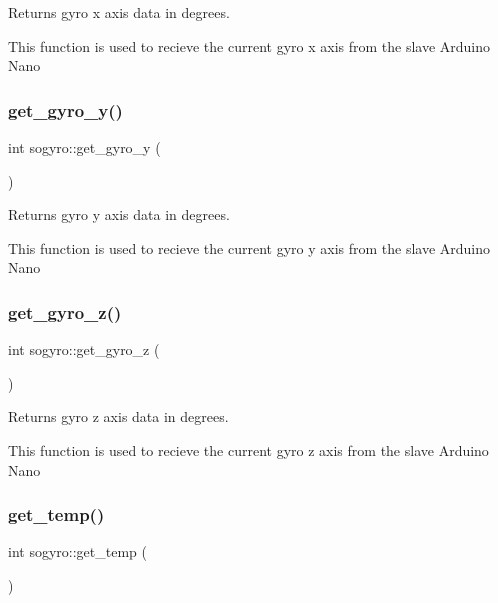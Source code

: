 Returns gyro x axis data in degrees. 

This function is used to recieve the current gyro x axis from the slave Arduino Nano \mbox{\label{classsogyro_a5d0a23dd18a82284625c479df3d1bb9b}} 
\subsubsection{\texorpdfstring{get\+\_\+gyro\+\_\+y()}{get\_gyro\_y()}}
{\footnotesize\ttfamily int sogyro\+::get\+\_\+gyro\+\_\+y (\begin{DoxyParamCaption}{ }\end{DoxyParamCaption})\hspace{0.3cm}{\ttfamily [inline]}}



Returns gyro y axis data in degrees. 

This function is used to recieve the current gyro y axis from the slave Arduino Nano \mbox{\label{classsogyro_a71e8f90b8fcb6a3351600a1dda5c8923}} 
\subsubsection{\texorpdfstring{get\+\_\+gyro\+\_\+z()}{get\_gyro\_z()}}
{\footnotesize\ttfamily int sogyro\+::get\+\_\+gyro\+\_\+z (\begin{DoxyParamCaption}{ }\end{DoxyParamCaption})\hspace{0.3cm}{\ttfamily [inline]}}



Returns gyro z axis data in degrees. 

This function is used to recieve the current gyro z axis from the slave Arduino Nano \mbox{\label{classsogyro_a762e79e3874507ba58910d90a115ea70}} 
\subsubsection{\texorpdfstring{get\+\_\+temp()}{get\_temp()}}
{\footnotesize\ttfamily int sogyro\+::get\+\_\+temp (\begin{DoxyParamCaption}{ }\end{DoxyParamCaption})\hspace{0.3cm}{\ttfamily [inline]}}



